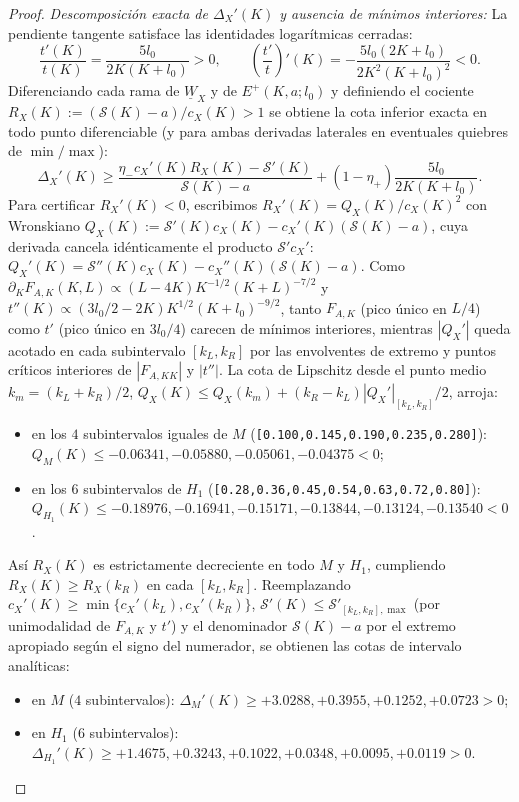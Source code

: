 \documentclass[11pt,letterpaper]{article}
\theoremstyle{plain}
\begin{document}
\begin{proof}
\emph{Descomposición exacta de $\Delta_X'(K)$ y ausencia de mínimos interiores:} La pendiente tangente satisface las identidades logarítmicas cerradas:
\[
\frac{t'(K)}{t(K)} = \frac{5l_0}{2K(K+l_0)} > 0, \qquad \left(\frac{t'}{t}\right)'(K) = -\frac{5l_0(2K+l_0)}{2K^2(K+l_0)^2} < 0.
\]
Diferenciando cada rama de $\underline{W}_X$ y de $E^+(K,a;l_0)$ y definiendo el cociente $R_X(K):=(\mathcal{S}(K)-a)/c_X(K)>1$ se obtiene la cota inferior exacta en todo punto diferenciable (y para ambas derivadas laterales en eventuales quiebres de $\min/\max$):
\[
\Delta_X'(K) \ge \frac{\eta_- c_X'(K)R_X(K) - \mathcal{S}'(K)}{\mathcal{S}(K)-a} + (1-\eta_+)\frac{5l_0}{2K(K+l_0)}.
\]
Para certificar $R_X'(K)<0$, escribimos $R_X'(K)=Q_X(K)/c_X(K)^2$ con Wronskiano $Q_X(K):=\mathcal{S}'(K)c_X(K)-c_X'(K)(\mathcal{S}(K)-a)$, cuya derivada cancela idénticamente el producto $\mathcal{S}'c_X'$: $Q_X'(K)=\mathcal{S}''(K)c_X(K)-c_X''(K)(\mathcal{S}(K)-a)$. Como $\partial_K F_{A,K}(K,L)\propto (L-4K)K^{-1/2}(K+L)^{-7/2}$ y $t''(K)\propto (3l_0/2 - 2K)K^{1/2}(K+l_0)^{-9/2}$, tanto $F_{A,K}$ (pico único en $L/4$) como $t'$ (pico único en $3l_0/4$) carecen de mínimos interiores, mientras $|Q_X'|$ queda acotado en cada subintervalo $[k_L,k_R]$ por las envolventes de extremo y puntos críticos interiores de $|F_{A,KK}|$ y $|t''|$. La cota de Lipschitz desde el punto medio $k_m=(k_L+k_R)/2$, $Q_X(K)\le Q_X(k_m) + (k_R-k_L)|Q_X'|_{[k_L,k_R]}/2$, arroja:
\begin{itemize}
\item en los $4$ subintervalos iguales de $M$ (\texttt{[0.100,0.145,0.190,0.235,0.280]}): $Q_M(K)\le -0.06341,-0.05880,-0.05061,-0.04375 < 0$;
\item en los $6$ subintervalos de $H_1$ (\texttt{[0.28,0.36,0.45,0.54,0.63,0.72,0.80]}): $Q_{H_1}(K)\le -0.18976,-0.16941,-0.15171,-0.13844,-0.13124,-0.13540 < 0$.
\end{itemize}
Así $R_X(K)$ es estrictamente decreciente en todo $M$ y $H_1$, cumpliendo $R_X(K)\ge R_X(k_R)$ en cada $[k_L,k_R]$. Reemplazando $c_X'(K)\ge\min\{c_X'(k_L),c_X'(k_R)\}$, $\mathcal{S}'(K)\le \mathcal{S}'_{[k_L,k_R],\max}$ (por unimodalidad de $F_{A,K}$ y $t'$) y el denominador $\mathcal{S}(K)-a$ por el extremo apropiado según el signo del numerador, se obtienen las cotas de intervalo analíticas:
\begin{itemize}
\item en $M$ ($4$ subintervalos): $\Delta_M'(K)\ge +3.0288,+0.3955,+0.1252,+0.0723 > 0$;
\item en $H_1$ ($6$ subintervalos): $\Delta_{H_1}'(K)\ge +1.4675,+0.3243,+0.1022,+0.0348,+0.0095,+0.0119 > 0$.

\end{itemize}
\end{proof}
\end{document}
